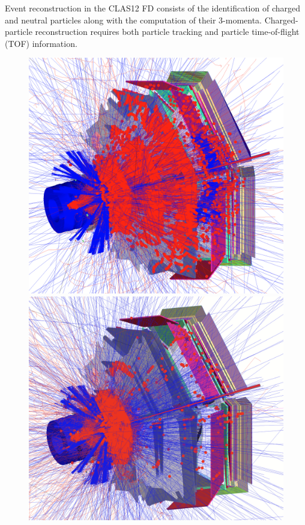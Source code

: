 \documentclass[final,3p,twocolumn]{elsarticle}
\begin{document}
Event reconstruction in the CLAS12 FD consists of the identification of charged and neutral particles along with the 
computation of their 3-momenta. Charged-particle reconstruction requires both particle tracking and particle 
time-of-flight (TOF) information. 
\begin{figure}[htbp!]
\centerline{
	\includegraphics[width=1.0\columnwidth, height=1.0\columnwidth]{NoField.png}
	\includegraphics[width=1.0\columnwidth, height=1.0\columnwidth]{NoSolenoidFullTorus.png}
}
\end{figure}
\end{document}
